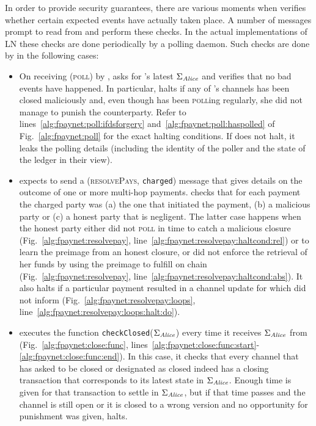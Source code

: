   In order to provide security guarantees, there are various moments when
  \fpaynet{} verifies whether certain expected events have actually taken place.
  A number of messages prompt \fpaynet{} to read from \ledger{} and perform
  these checks. In the actual implementations of LN these checks are done
  periodically by a polling daemon. Such checks are done by \fpaynet{} in the
  following cases:
  \begin{itemize}
    \item On receiving (\textsc{poll}) by \alice, \fpaynet{} asks \ledger{} for
    \alice's latest $\Sigma_{\mathit{Alice}}$ and verifies that no bad events have
    happened. In particular, \fpaynet{} halts if any of \alice's channels has
    been closed maliciously and, even though \alice{} has been \textsc{poll}ing
    regularly, she did not manage to punish the counterparty. Refer to
    lines~\ref{alg:fpaynet:poll:ifdsforgery}
    and~\ref{alg:fpaynet:poll:haspolled} of Fig.~\ref{alg:fpaynet:poll} for the
    exact halting conditions. If \fpaynet{} does not halt, it leaks 
    \simulator{} the polling details (including the identity of the poller and the state of the ledger in their view). 
    \item \fpaynet{} expects \simulator{} to send a (\textsc{resolvePays},
    \texttt{charged}) message that gives details on the outcome of one or more
    multi-hop payments. \fpaynet{} checks that for each payment the charged
    party was (a) the one that initiated the payment, (b) a malicious party or
    (c) a honest party that is negligent. The latter case happens when the honest party  either did not \textsc{poll} in time to catch a malicious
    closure (Fig.~\ref{alg:fpaynet:resolvepay},
    line~\ref{alg:fpaynet:resolvepay:haltcond:rel}) or to learn the preimage
    from an honest closure, or did not enforce the retrieval of her funds by
    using the preimage to fulfill on chain (Fig.~\ref{alg:fpaynet:resolvepay},
    line~\ref{alg:fpaynet:resolvepay:haltcond:abs}). It also halts if a
    particular payment resulted in a channel update for which \simulator{} did
    not inform \fpaynet{} (Fig.~\ref{alg:fpaynet:resolvepay:loops},
    line~\ref{alg:fpaynet:resolvepay:loops:halt:do}).
    \item \fpaynet{} executes the function
    \texttt{checkClosed}($\Sigma_{\mathit{Alice}}$) every time it receives
    $\Sigma_{\mathit{Alice}}$ from \ledger{} (Fig.~\ref{alg:fpaynet:close:func},
    lines~\ref{alg:fpaynet:close:func:start}-\ref{alg:fpaynet:close:func:end}).
    In this case, it checks that every channel that \environment{} has asked to be closed
    or \simulator{} designated as closed indeed has a closing transaction that
    corresponds to its latest state in $\Sigma_{\mathit{Alice}}$. Enough time is given
    for that transaction to settle in $\Sigma_{\mathit{Alice}}$, but if that time passes
    and the channel is still open or it is closed to a wrong version and no
    opportunity for punishment was given, \fpaynet{} halts.
  \end{itemize}

